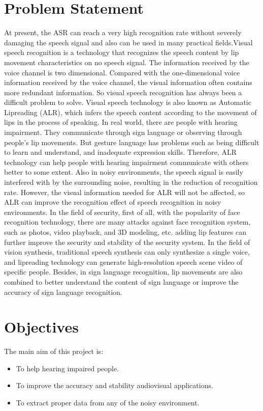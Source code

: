\section{Problem Statement}
	At present, the ASR can reach a very high recognition rate without severely damaging the speech signal and also can be used in many practical fields.Visual speech recognition is a technology that recognizes the speech content by lip movement characteristics on no speech signal. The information received by the voice channel is two dimensional. Compared with the one-dimensional voice information received by the voice channel, the visual information often contains more redundant information. So visual speech recognition has always been a difficult problem to solve. Visual speech technology is also known as Automatic Lipreading (ALR), which infers the speech content according to the movement of lips in the process of speaking. In real world, there are people with hearing impairment. They communicate through sign language or observing through people’s lip movements. But gesture language has problems such as being difficult to learn and understand, and inadequate expression skills. Therefore, ALR technology can help people with hearing impairment communicate with others better to some extent. Also in noisy environments, the speech signal is easily interfered with by the surrounding noise, resulting in the reduction of recognition rate. However, the visual information needed for ALR will not be affected, so ALR can improve the recognition effect of speech recognition in noisy environments. In the field of security, first of all, with the popularity of face recognition technology, there are many attacks against face recognition system, such as photos, video playback, and 3D modeling, etc. adding lip features can further improve the security and stability of the security system. In the field of vision synthesis, traditional speech synthesis can only synthesize a single voice, and lipreading technology can generate high-resolution speech scene video of specific people. Besides, in sign language recognition, lip movements are also combined to better understand the content of sign language or improve the accuracy of sign language recognition. 

\section{Objectives}
	The main aim of this project is:
\begin{itemize}
	\item To help hearing impaired people.
	\item To improve the accuracy and stability audiovisual applications. 
	\item To extract proper data from any of the noisy environment.
\end{itemize}	
	

